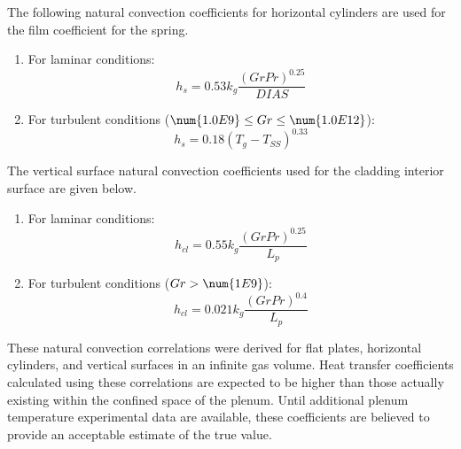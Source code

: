 The following natural convection coefficients for horizontal cylinders are used for the film
coefficient for the spring.
\begin{enumerate}
    \item
      For laminar conditions:
        \begin{equation}
            \label{eq:cylinder_natural_convection_laminar}
            h_{s} = 0.53k_{g}\frac{\left( GrPr \right)^{0.25}}{DIAS}
        \end{equation}
    \item
        For turbulent conditions ($\num{1.0E9} \leq Gr \leq \num{1.0E12}$):
        \begin{equation}
            \label{eq:cylinder_natural_convection_tubulent}
            h_{s} = 0.18\left( T_{g} - T_{SS} \right)^{0.33}
        \end{equation}
\end{enumerate}

The vertical surface natural convection coefficients used for the
cladding interior surface are given below.
\begin{enumerate}
    \item
      For laminar conditions:
        \begin{equation}
            \label{eq:vertical_natural_convection_laminar}
            h_{cl} = 0.55k_{g}\frac{\left( GrPr \right)^{0.25}}{L_{p}}
        \end{equation}
    
    \item
        For turbulent conditions ($Gr > \num{1E9}$):
        \begin{equation}
            \label{eq:vertical_natural_convection_turbulent}
            h_{cl} = 0.021k_{g}\frac{\left( GrPr \right)^{0.4}}{L_{p}}
        \end{equation}
\end{enumerate}

These natural convection correlations were derived for flat plates, horizontal cylinders, and
vertical surfaces in an infinite gas volume.  Heat transfer coefficients calculated using these
correlations are expected to be higher than those actually existing within the confined space of the
plenum. Until additional plenum temperature experimental data are available, these coefficients are
believed to provide an acceptable estimate of the true value.
